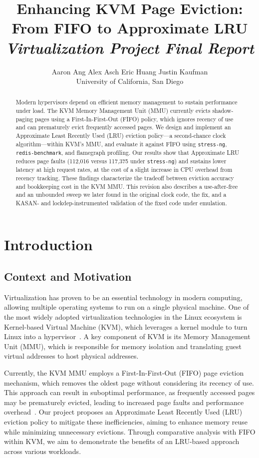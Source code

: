 \documentclass[letterpaper,twocolumn,10pt]{article}
\date{}
\title{\Large \bf Enhancing KVM Page Eviction: From FIFO to Approximate LRU\\[0.3em]
  \large \it Virtualization Project Final Report}
\author{
{\rm Aaron Ang \quad Alex Asch \quad Eric Huang \quad Justin Kaufman}\\
University of California, San Diego
}
\begin{document}
\maketitle

\begin{abstract}
Modern hypervisors depend on efficient memory management to sustain performance
under load. The KVM Memory Management Unit (MMU) currently evicts shadow-paging
pages using a First-In-First-Out (FIFO) policy, which ignores recency of use and
can prematurely evict frequently accessed pages. We design and implement an
Approximate Least Recently Used (LRU) eviction policy---a second-chance clock
algorithm---within KVM's MMU, and evaluate it against FIFO using \texttt{stress-ng},
\texttt{redis-benchmark}, and flamegraph profiling. Our results show that
Approximate LRU reduces page faults (112,016 versus 117,375 under \texttt{stress-ng})
and sustains lower latency at high request rates, at the cost of a slight increase
in CPU overhead from recency tracking. These findings characterize the tradeoff
between eviction accuracy and bookkeeping cost in the KVM MMU. This revision
also describes a use-after-free and an unbounded sweep we later found in the
original clock code, the fix, and a KASAN- and lockdep-instrumented validation
of the fixed code under emulation.
\end{abstract}

\section{Introduction}

\subsection{Context and Motivation}

Virtualization has proven to be an essential technology in modern computing,
allowing multiple operating systems to run on a single physical machine. One of
the most widely adopted virtualization technologies in the Linux ecosystem is
Kernel-based Virtual Machine (KVM), which leverages a kernel module to
turn Linux into a hypervisor~\cite{kivity2007}. A key component of KVM is its Memory
Management Unit (MMU), which is responsible for memory isolation and translating
guest virtual addresses to host physical addresses.

Currently, the KVM MMU employs a First-In-First-Out (FIFO) page eviction
mechanism, which removes the oldest page without considering its recency of use.
This approach can result in suboptimal performance, as frequently accessed pages
may be prematurely evicted, leading to increased page faults and performance
overhead~\cite{belady1966}. Our project proposes an Approximate Least Recently Used (LRU)
eviction policy to mitigate these inefficiencies, aiming to enhance memory reuse
while minimizing unnecessary evictions. Through comparative analysis with FIFO
within KVM, we aim to demonstrate the benefits of an LRU-based approach across
various workloads.
\end{document}
